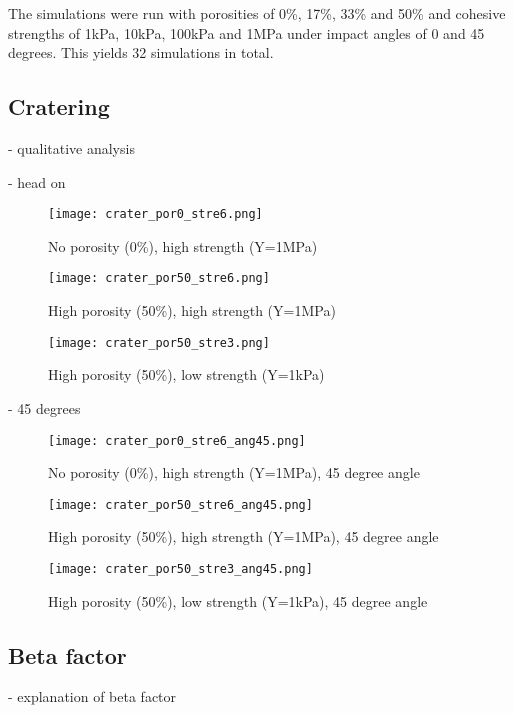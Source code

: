 The simulations were run with porosities of 0\%, 17\%, 33\% and 50\% and cohesive strengths of 1kPa, 10kPa, 100kPa and 1MPa under impact angles of 0 and 45 degrees. This yields 32 simulations in total.

\subsection{Cratering}
- qualitative analysis

- head on
\begin{figure}[H]
   \centering
   \texttt{[image: crater\_por0\_stre6.png]}
   \caption{No porosity (0\%), high strength (Y=1MPa)}
   \label{fig:crater1}
\end{figure}


\begin{figure}[H]
   \centering
   \texttt{[image: crater\_por50\_stre6.png]}
   \caption{High porosity (50\%), high strength (Y=1MPa)}
   \label{fig:crater2}
\end{figure}

\begin{figure}[H]
   \centering
   \texttt{[image: crater\_por50\_stre3.png]}
   \caption{High porosity (50\%), low strength (Y=1kPa)}
   \label{fig:crater3}
\end{figure}

- 45 degrees
\begin{figure}[H]
   \centering
   \texttt{[image: crater\_por0\_stre6\_ang45.png]}
   \caption{No porosity (0\%), high strength (Y=1MPa), 45 degree angle}
   \label{fig:crater4}
\end{figure}


\begin{figure}[H]
   \centering
   \texttt{[image: crater\_por50\_stre6\_ang45.png]}
   \caption{High porosity (50\%), high strength (Y=1MPa), 45 degree angle}
   \label{fig:crater5}
\end{figure}

\begin{figure}[H]
   \centering
   \texttt{[image: crater\_por50\_stre3\_ang45.png]}
   \caption{High porosity (50\%), low strength (Y=1kPa), 45 degree angle}
   \label{fig:crater6}
\end{figure}

\subsection{Beta factor}
- explanation of beta factor

